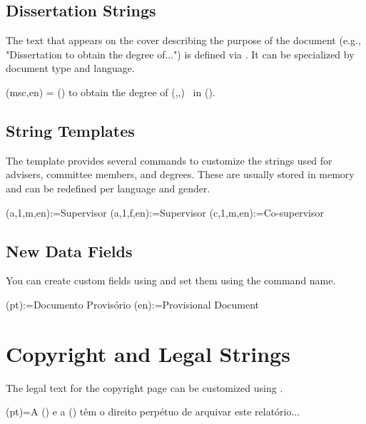 \subsection{Dissertation Strings}
The text that appears on the cover describing the purpose of the document (e.g., "Dissertation to obtain the degree of...") is defined via \latexinline{\dissertationstring}. It can be specialized by document type and language.

\begin{ltx}
\dissertationstring(msc,en) = {%
  \GetDocType() to obtain the degree of %
  \thedegreestring(,,\@LANG@COVER)%
  \ in \themajorfield(\@LANG@COVER).%
}
\end{ltx}

\subsection{String Templates}
The template provides several commands to customize the strings used for advisers, committee members, and degrees. These are usually stored in memory and can be redefined per language and gender.

\begin{ltx}
\adviserstring(a,1,m,en):={Supervisor}
\adviserstring(a,1,f,en):={Supervisor}
\adviserstring(c,1,m,en):={Co-supervisor}
\end{ltx}

\subsection{New Data Fields}
You can create custom fields using \latexinline{\newdata} and set them using the command name.

\begin{ltx}
\provisionalstring(pt):={Documento Provisório}
\provisionalstring(en):={Provisional Document}
\end{ltx}

\section{Copyright and Legal Strings}
\label{sec:copyright}

The legal text for the copyright page can be customized using \latexinline{\copyrighttextstring}.

\begin{ltx}
\copyrighttextstring(pt)={A \theschool(\@LANG@COPYRIGHT) e a \theuniversity(\@LANG@COPYRIGHT) têm o direito perpétuo de arquivar este relatório...}
\end{ltx}

